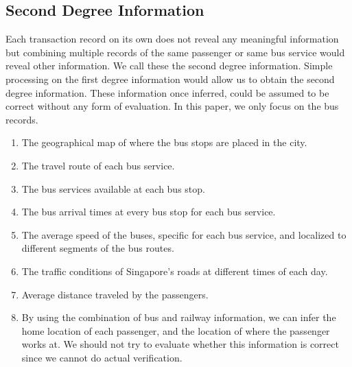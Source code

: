 \documentclass[10pt]{article}
\begin{document}
\subsection{Second Degree Information}
Each transaction record on its own does not reveal any meaningful information but combining multiple records of the same passenger or same bus service would reveal other information. We call these the second degree information. Simple processing on the first degree information would allow us to obtain the second degree information. These information once inferred, could be assumed to be correct without any form of evaluation. In this paper, we only focus on the bus records. 

\begin{enumerate}
	\item The geographical map of where the bus stops are placed in the city.
	\item The travel route of each bus service.
	\item The bus services available at each bus stop.
	\item The bus arrival times at every bus stop for each bus service.
	\item The average speed of the buses, specific for each bus service, and localized to different segments of the bus routes.
	\item The traffic conditions of Singapore's roads at different times of each day.
	\item Average distance traveled by the passengers.
	\item By using the combination of bus and railway information, we can infer the home location of each passenger, and the location of where the passenger works at. We should not try to evaluate whether this information is correct since we cannot do actual verification.
\end{enumerate}
\end{document}

